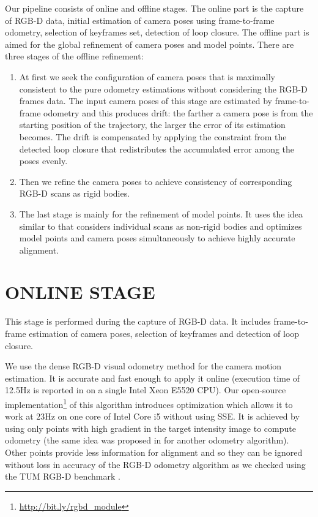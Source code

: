 \documentclass[letterpaper, 10 pt, conference]{ieeeconf}  %
\begin{document}
Our pipeline consists of online and offline stages. The online part is the capture of RGB-D data,
initial estimation of camera poses using frame-to-frame odometry,
selection of keyframes set, detection of loop closure. The offline part is aimed for
the global refinement of camera poses and model points. There are three stages
of the offline refinement:

\begin{enumerate}
\item At first we seek the configuration of camera poses that is
maximally consistent to the pure odometry estimations without 
considering the RGB-D frames data. The input camera poses of this stage
are estimated by frame-to-frame odometry and this produces drift: 
the farther a camera pose is from the starting position of the trajectory, 
the larger the error of its estimation becomes. The drift is compensated
by applying the constraint from the detected loop closure 
that redistributes the accumulated error among the poses evenly.

\item Then we refine the camera poses to achieve 
consistency of corresponding RGB-D scans as rigid bodies.

\item The last stage is mainly for the refinement of model points. It uses the idea similar to \cite{ruhnke2012highly}
that considers individual scans as non-rigid bodies and optimizes
model points and camera poses simultaneously to achieve highly accurate alignment.

\end{enumerate}

\section{ONLINE STAGE}

This stage is performed during the capture of RGB-D data. It includes
frame-to-frame estimation of camera poses, selection of keyframes and 
detection of loop closure.

We use the dense RGB-D visual odometry
method \cite{steinbrucker2011real} for the camera motion estimation.
It is accurate and fast enough to apply it online
(execution time of 12.5Hz is reported in \cite{steinbrucker2011real}
on a single Intel Xeon E5520 CPU).
Our open-source implementation\footnote{\label{note1}\href{http://bit.ly/rgbd\_module}{http://bit.ly/rgbd\_module}} of this algorithm
introduces optimization which allows it to work at 23Hz on one core
of Intel Core i5 without using SSE.
It is achieved by using only points with high gradient in the target intensity image
to compute odometry (the same idea was proposed in \cite{tykkala2011direct} for another odometry algorithm).
Other points provide less information for alignment
and so they can be ignored without loss in accuracy of the RGB-D odometry algorithm
as we checked using the TUM RGB-D benchmark \cite{sturm12iros}.
\end{document}
